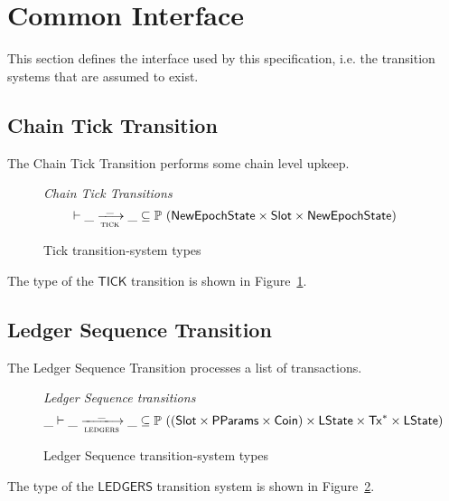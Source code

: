\section{Common Interface}
\label{sec:common-interface}

This section defines the interface used by this specification, i.e.
the transition systems that are assumed to exist.

\subsection{Chain Tick Transition}
\label{sec:tick-trans}

The Chain Tick Transition performs some chain level upkeep.
\begin{figure}[htb]
  \emph{Chain Tick Transitions}
  \begin{equation*}
    \vdash \var{\_} \trans{tick}{\_} \var{\_} \subseteq
    \powerset (\NewEpochState \times \Slot \times \NewEpochState)
  \end{equation*}
  \caption{Tick transition-system types}
  \label{fig:ts-types:tick}
\end{figure}

The type of the $\mathsf{TICK}$ transition is shown in Figure~\ref{fig:ts-types:tick}.

\subsection{Ledger Sequence Transition}
\label{sec:ledgers-trans}

The Ledger Sequence Transition processes a list of transactions.
\begin{figure}[htb]
  \emph{Ledger Sequence transitions}
  \begin{equation*}
    \_ \vdash
    \var{\_} \trans{ledgers}{\_} \var{\_}
    \subseteq \powerset ((\Slot\times\PParams\times\Coin) \times \LState \times \seqof{\Tx} \times \LState)
  \end{equation*}
  \caption{Ledger Sequence transition-system types}
  \label{fig:ts-types:ledgers}
\end{figure}

The type of the $\mathsf{LEDGERS}$ transition system is shown in Figure~\ref{fig:ts-types:ledgers}.

